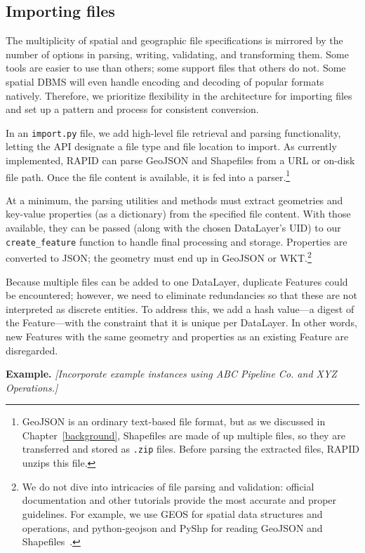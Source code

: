 \subsection{Importing files}
The multiplicity of spatial and geographic file specifications is mirrored by the number of options in parsing, writing, validating, and transforming them. Some tools are easier to use than others; some support files that others do not. Some spatial DBMS will even handle encoding and decoding of popular formats natively. Therefore, we prioritize flexibility in the architecture for importing files and set up a pattern and process for consistent conversion.
 
In an \texttt{import.py} file, we add high-level file retrieval and parsing functionality, letting the API designate a file type and file location to import. As currently implemented, RAPID can parse GeoJSON and Shapefiles from a URL or on-disk file path. Once the file content is available, it is fed into a parser.\footnote{GeoJSON is an ordinary text-based file format, but as we discussed in Chapter~\ref{background}, Shapefiles are made of up multiple files, so they are transferred and stored as \texttt{.zip} files. Before parsing the extracted files, RAPID unzips this file.}

At a minimum, the parsing utilities and methods must extract geometries and key-value properties (as a dictionary) from the specified file content. With those available, they can be passed (along with the chosen DataLayer's UID) to our \texttt{create\_feature} function to handle final processing and storage. Properties are converted to JSON; the geometry must end up in GeoJSON or WKT.\footnote{We do not dive into intricacies of file parsing and validation: official documentation and other tutorials provide the most accurate and proper guidelines. For example, we use GEOS for spatial data structures and operations, and python-geojson and PyShp for reading GeoJSON and Shapefiles~\cite{GEOS,Farwell2014,pyshp}.}

Because multiple files can be added to one DataLayer, duplicate Features could be encountered; however, we need to eliminate redundancies so that these are not interpreted as discrete entities. To address this, we add a hash value---a digest of the Feature---with the constraint that it is unique per DataLayer. In other words, new Features with the same geometry and properties as an existing Feature are disregarded.

\textbf{Example.} \textit{[Incorporate example instances using ABC Pipeline Co. and XYZ Operations.]}

